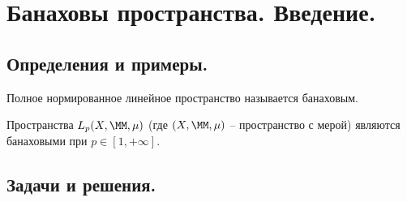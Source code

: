 \part{Банаховы пространства. Введение.}
\chapter{Определения и примеры.}
\begin{definition}
    Полное нормированное линейное пространство называется банаховым.
\end{definition}
\begin{example}
    Пространства $L_p(X, \MM, \mu)$ (где $(X, \MM, \mu)$ -- пространство с мерой) являются банаховыми при $p \in [1, +\infty]$.
\end{example}

\chapter{Задачи и решения.}